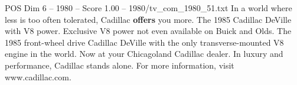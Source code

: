 \begin{textsample}{POS Dim 6 – 1980 – Score 1.00 – 1980/tv\_com\_1980\_51.txt}  \label{ex:f6_pos_052}
In a world where less is too often tolerated, Cadillac \textbf{offers} you more.
The 1985 Cadillac DeVille with V8 power.
Exclusive V8 power not even available on Buick and Olds.
The 1985 front-wheel drive Cadillac DeVille with the only transverse-mounted V8 engine in the world.
Now at your Chicagoland Cadillac dealer.
In luxury and performance, Cadillac stands alone.
For more information, visit www.cadillac.com.

\end{textsample}
